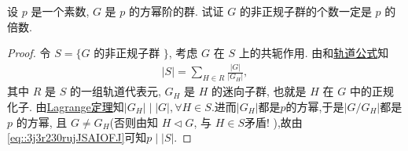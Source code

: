 \documentclass[../../main.tex]{subfiles}%
\begin{document}
\begin{example}
设 $p$ 是一个素数, $G$ 是 $p$ 的方幂阶的群. 试证 $G$ 的非正规子群的个数一定是 $p$ 的倍数.
\end{example}
\begin{proof}
令 $S = \{ G$ 的非正规子群 $\}$, 考虑 $G$ 在 $S$ 上的共轭作用. 由和\hyperref[corollary:有限群轨道的阶与其商掉迷向子群的阶相同]{轨道公式}知
\begin{align}\label{eq::3j3r230rujJSAIOFJ}
|S| = \sum\limits_{H \in R} \frac{|G|}{|G_H|},
\end{align}
其中 $R$ 是 $S$ 的一组轨道代表元, $G_H$ 是 $H$ 的迷向子群, 也就是 $H$ 在 $G$ 中的正规化子. 由\hyperref[theorem:抽象代数--Lagrange定理]{Lagrange定理}知$|G_H|\mid |G|,\forall H\in S$.进而$|G_H|$都是$p$的方幂,于是$|G/G_H|$都是 $p$ 的方幂, 且 $G \neq G_H$(否则由知 $H \lhd G$, 与 $H \in S$矛盾! ),故由\eqref{eq::3j3r230rujJSAIOFJ}可知$p \mid |S|$.
\end{proof}
\end{document}
